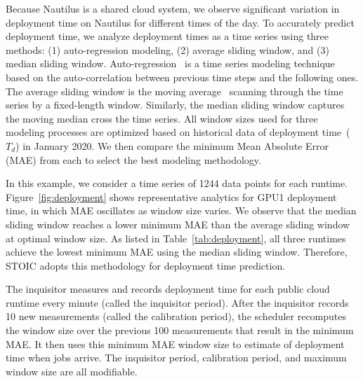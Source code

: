 Because Nautilus is a shared cloud system, we observe significant variation in deployment time on Nautilus for different times of the day. To accurately predict deployment time, we analyze deployment times as a time series using three methods: (1) auto-regression modeling, (2) average sliding window, and (3) median sliding window. Auto-regression~\cite{ref:autoreg} is a time series modeling technique based on the auto-correlation between previous time steps and the following ones. The average sliding window is the moving average~\cite{ref:moveavg} scanning through the time series by a fixed-length window. Similarly, the median sliding window captures the moving median cross the time series. All window sizes used for three modeling processes are optimized based on historical data of deployment time~($T_d$) in January 2020. We then compare the minimum Mean Absolute Error (MAE) from each to select the best modeling methodology. 

In this example, we consider a time series of 1244 data points for each runtime. Figure~\ref{fig:deployment} shows representative analytics for GPU1 deployment time, in which MAE oscillates as window size varies. We observe that the median sliding window reaches a lower minimum MAE than the average sliding window at optimal window size. As listed in Table~\ref{tab:deployment}, all three runtimes achieve the lowest minimum MAE using the median sliding window. Therefore, STOIC adopts this methodology for deployment time prediction. 

The inquisitor measures and records deployment time for each public cloud runtime every minute (called the inquisitor period). After the inquisitor records 10 new measurements (called the calibration period), the scheduler recomputes the window size over the previous 100 measurements that result in the minimum MAE. It then uses this minimum MAE window size to estimate of deployment time when jobs arrive. The inquisitor period, calibration period, and maximum window size are all modifiable.

 
